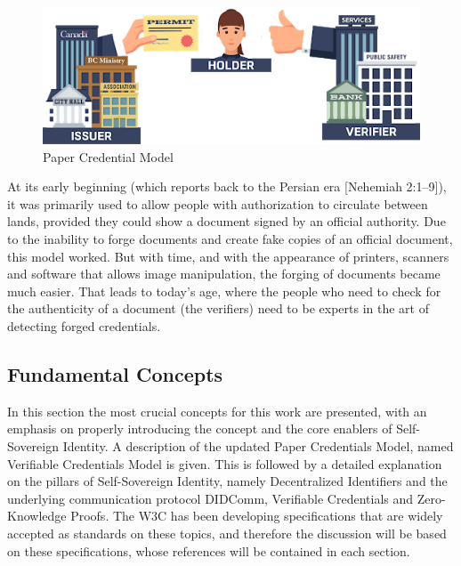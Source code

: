 \begin{figure}[!htb]
    \centering
    \includegraphics[width=0.7\linewidth]{images/The_Paper_Credential_Model.png}
    \caption[Paper Credential Model]{Paper Credential Model\protect \footnotemark}
    \label{fig:paper_credential_model}
\end{figure}


At its early beginning (which reports back to the Persian era [Nehemiah 2:1–9]), it was primarily used to allow people with authorization to circulate between lands, provided they could show a document signed by an official authority. Due to the inability to forge documents and create fake copies of an official document, this model worked. But with time, and with the appearance of printers, scanners and software that allows image manipulation, the forging of documents became much easier. That leads to today's age, where the people who need to check for the authenticity of a document (the verifiers) need to be experts in the art of detecting forged credentials.

\subsection{Fundamental Concepts}
\label{subsec:fundamental_concepts}

In this section the most crucial concepts for this work are presented, with an emphasis on properly introducing the concept and the core enablers of Self-Sovereign Identity. A description of the updated Paper Credentials Model, named Verifiable Credentials Model is given. This is followed by a detailed explanation on the pillars of Self-Sovereign Identity, namely Decentralized Identifiers and the underlying communication protocol DIDComm, Verifiable Credentials and Zero-Knowledge Proofs. The \acrfull{W3C} has been developing specifications that are widely accepted as standards on these topics, and therefore the discussion will be based on these specifications, whose references will be contained in each section.

